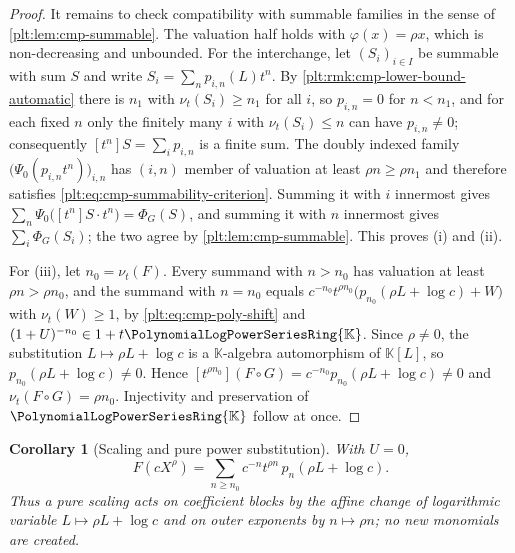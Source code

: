 \documentclass[11pt,oneside]{article}
\theoremstyle{plain}
\newtheorem{corollary}[theorem]{Corollary}
\theoremstyle{definition}
\theoremstyle{remark}
\newcommand{\K}{\mathbb{K}}
\newcommand{\PLpow}{\PolynomialLogPowerSeriesRing{\K}}   %
\newcommand{\ordt}{\nu_{t}}                              %
\newcommand{\compose}{\mathbin{\circ}}
\begin{document}
\begin{proof}
It remains to check compatibility with summable families in the sense of
\cref{plt:lem:cmp-summable}.  The valuation half holds with
\(\varphi(x)=\rho x\), which is non-decreasing and unbounded.  For the
interchange, let \((S_i)_{i\in I}\) be summable with sum \(S\) and write
\(S_i=\sum_np_{i,n}(L)t^n\).  By
\cref{plt:rmk:cmp-lower-bound-automatic} there is \(n_1\) with
\(\ordt(S_i)\ge n_1\) for all \(i\), so \(p_{i,n}=0\) for \(n<n_1\), and for
each fixed \(n\) only the finitely many \(i\) with \(\ordt(S_i)\le n\) can
have \(p_{i,n}\ne0\); consequently \([t^n]S=\sum_ip_{i,n}\) is a finite sum.
The doubly indexed family \(\bigl(\Psi_0(p_{i,n}t^n)\bigr)_{i,n}\) has
\((i,n)\) member of valuation at least \(\rho n\ge\rho n_1\) and therefore
satisfies \eqref{plt:eq:cmp-summability-criterion}.  Summing it with \(i\)
innermost gives \(\sum_n\Psi_0\bigl([t^n]S\cdot t^n\bigr)=\Phi_G(S)\), and
summing it with \(n\) innermost gives \(\sum_i\Phi_G(S_i)\); the two agree by
\cref{plt:lem:cmp-summable}.
This proves (i) and (ii).

For (iii), let \(n_0=\ordt(F)\).  Every summand with \(n>n_0\) has valuation
at least \(\rho n>\rho n_0\), and the summand with \(n=n_0\) equals
\(c^{-n_0}t^{\rho n_0}\bigl(p_{n_0}(\rho L+\log c)+W\bigr)\) with
\(\ordt(W)\ge1\), by \eqref{plt:eq:cmp-poly-shift} and
\((1+U)^{-n_0}\in1+t\PLpow\).  Since \(\rho\ne0\), the substitution
\(L\mapsto\rho L+\log c\) is a \(\K\)-algebra automorphism of \(\K[L]\), so
\(p_{n_0}(\rho L+\log c)\ne0\).  Hence
\([t^{\rho n_0}](F\compose G)=c^{-n_0}p_{n_0}(\rho L+\log c)\ne0\) and
\(\ordt(F\compose G)=\rho n_0\).  Injectivity and preservation of
\(\PLpow\) follow at once.
\end{proof}

\begin{corollary}[Scaling and pure power substitution]
\label{plt:cor:cmp-pure-power}
With \(U=0\),
\[
 F(cX^{\rho})
 =\sum_{n\ge n_0}c^{-n}t^{\rho n}\,p_n(\rho L+\log c).
\]
Thus a pure scaling acts on coefficient blocks by the affine change of
logarithmic variable \(L\mapsto\rho L+\log c\) and on outer exponents by
\(n\mapsto\rho n\); no new monomials are created.
\end{corollary}
\end{document}
